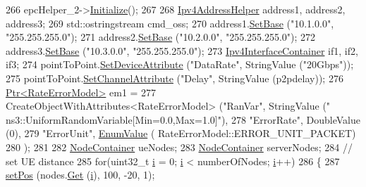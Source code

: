 \begin{DoxyCode}
{{{266   epcHelper\_2->\hyperlink{classns3_1_1Object_af4411cb29971772fcd09203474a95078}{Initialize}();
267 
268   \hyperlink{classns3_1_1Ipv4AddressHelper}{Ipv4AddressHelper} address1, address2, address3;
269   std::ostringstream cmd\_oss;
270   address1.\hyperlink{classns3_1_1Ipv4AddressHelper_acf7b16dd25bac67e00f5e25f90a9a035}{SetBase} (\textcolor{stringliteral}{"10.1.0.0"}, \textcolor{stringliteral}{"255.255.255.0"});
271   address2.\hyperlink{classns3_1_1Ipv4AddressHelper_acf7b16dd25bac67e00f5e25f90a9a035}{SetBase} (\textcolor{stringliteral}{"10.2.0.0"}, \textcolor{stringliteral}{"255.255.255.0"});
272   address3.\hyperlink{classns3_1_1Ipv4AddressHelper_acf7b16dd25bac67e00f5e25f90a9a035}{SetBase} (\textcolor{stringliteral}{"10.3.0.0"}, \textcolor{stringliteral}{"255.255.255.0"});
273   \hyperlink{classns3_1_1Ipv4InterfaceContainer}{Ipv4InterfaceContainer} if1, if2, if3;
274   pointToPoint.\hyperlink{classns3_1_1PointToPointHelper_a4577f5ab8c387e5528af2e0fbab1152e}{SetDeviceAttribute} (\textcolor{stringliteral}{"DataRate"}, StringValue (\textcolor{stringliteral}{"20Gbps"}));
275   pointToPoint.\hyperlink{classns3_1_1PointToPointHelper_a6b5317fd17fb61e5a53f8d66a90b63b9}{SetChannelAttribute} (\textcolor{stringliteral}{"Delay"}, StringValue (p2pdelay));
276   \hyperlink{classns3_1_1Ptr}{Ptr<RateErrorModel>} em1 =
277     CreateObjectWithAttributes<RateErrorModel> (\textcolor{stringliteral}{"RanVar"}, StringValue (\textcolor{stringliteral}{"
      ns3::UniformRandomVariable[Min=0.0,Max=1.0]"}),
278                                                 \textcolor{stringliteral}{"ErrorRate"}, DoubleValue (0),
279                                                 \textcolor{stringliteral}{"ErrorUnit"}, \hyperlink{classns3_1_1EnumValue}{EnumValue} (
      RateErrorModel::ERROR\_UNIT\_PACKET)
280                                                 );
281 
282   \hyperlink{classns3_1_1NodeContainer}{NodeContainer} ueNodes;
283   \hyperlink{classns3_1_1NodeContainer}{NodeContainer} serverNodes;
284   \textcolor{comment}{// set UE distance}
285   \textcolor{keywordflow}{for}(uint32\_t \hyperlink{bernuolliDistribution_8m_a6f6ccfcf58b31cb6412107d9d5281426}{i} = 0; \hyperlink{bernuolliDistribution_8m_a6f6ccfcf58b31cb6412107d9d5281426}{i} < numberOfNodes; \hyperlink{bernuolliDistribution_8m_a6f6ccfcf58b31cb6412107d9d5281426}{i}++)
286   \{
287       \hyperlink{dce-example-mptcp-mmwave_8cc_af9909077be6393b8cc46f5ac55a77f84}{setPos} (nodes.\hyperlink{classns3_1_1NodeContainer_a9ed96e2ecc22e0f5a3d4842eb9bf90bf}{Get} (\hyperlink{bernuolliDistribution_8m_a6f6ccfcf58b31cb6412107d9d5281426}{i}), 100, -20, 1);
}}}
\end{DoxyCode}

